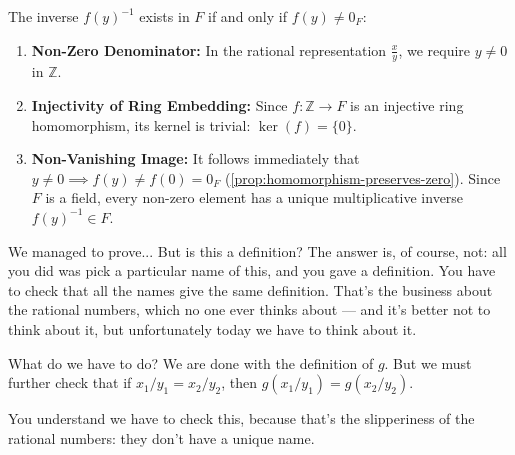 \begin{content}

\begin{steps}
The inverse $f(y)^{-1}$ exists in $F$ if and only if $f(y) \ne 0_F$:
\begin{enumerate}[label=\textbf{(\arabic*)}]
    \setcounter{enumi}{0} \item \textbf{Non-Zero Denominator:} In the rational representation $\frac{x}{y}$, we require $y \ne 0$ in $\mathbb{Z}$.
    \setcounter{enumi}{1} \item \textbf{Injectivity of Ring Embedding:} Since $f \colon \mathbb{Z} \to F$ is an injective ring homomorphism, its kernel is trivial: $\ker(f) = \{0\}$.
    \setcounter{enumi}{2} \item \textbf{Non-Vanishing Image:} It follows immediately that $y \ne 0 \implies f(y) \ne f(0) = 0_F$ (\cref{prop:homomorphism-preserves-zero}). Since $F$ is a field, every non-zero element has a unique multiplicative inverse $f(y)^{-1} \in F$.
\end{enumerate}
\end{steps}
\end{content}

\begin{speech}[00:23:11 - 00:25:18]
We managed to prove... But is this a definition? The answer is, of course, not: all you did was pick a particular name of this, and you gave a definition. You have to check that all the names give the same definition. That's the business about the rational numbers, which no one ever thinks about --- and it's better not to think about it, but unfortunately today we have to think about it.


What do we have to do?  We are done with the definition of $g$. But we must further check that if $x_1/y_1 = x_2/y_2$,  then $g(x_1/y_1) = g(x_2/y_2)$. 

You understand we have to check this, because that's the slipperiness of the rational numbers: they don't have a unique name.
\end{speech}

